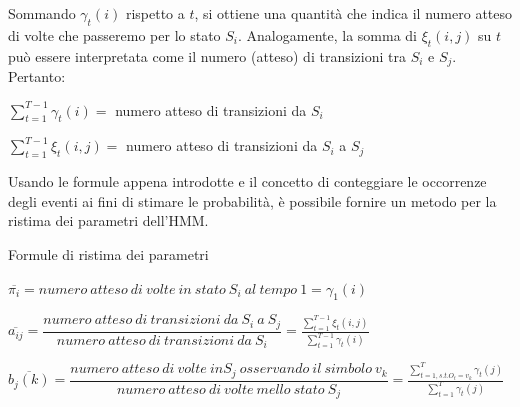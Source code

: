 \documentclass[slidestop,mathserif,red]{beamer}
\begin{document}
\begin{frame}
 \begin{block}{}
  Sommando $\gamma_{t}(i)$ rispetto a $t$, si ottiene una quantit\`a che indica il numero atteso di volte che passeremo per lo stato $S_{i}$. Analogamente, la somma di $\xi_{t}(i,j)$ su $t$ pu\`o essere interpretata come il numero (atteso) di transizioni tra $S_{i}$ e $S_{j}$. Pertanto:
\begin{center}
 $\sum_{t=1}^{T-1}\gamma_{t}(i) =$ numero atteso di transizioni da $S_{i}$
\end{center}
\begin{center}
 $\sum_{t=1}^{T-1}\xi_{t}(i,j) =$ numero atteso di transizioni da $S_{i}$ a $S_{j}$
\end{center}
 \end{block}

\begin{block}{}
 Usando le formule appena introdotte e il concetto di conteggiare le occorrenze degli eventi ai fini di stimare le probabilit\`a, \`e possibile fornire un metodo per la ristima dei parametri dell'HMM.
\end{block}
\end{frame}

\begin{frame}
 \begin{block}{Formule di ristima dei parametri}
 \begin{center}
$\overline{\pi_{i}} = numero\ atteso\ di\ volte\ in\ stato\ S_{i}\ al\ tempo\ 1 = \gamma_{1}(i)$
\end{center}

\begin{center}
 $\overline{a_{ij}} = \dfrac{numero\ atteso\ di\ transizioni\ da\ S_{i}\ a\ S_{j}}{numero\ atteso\ di\ transizioni\ da\ S_{i}} = \frac{\sum_{t=1}^{T-1}\xi_{t}(i,j)}{\sum_{t=1}^{T-1}\gamma_{t}(i)}$
\end{center}

\begin{center}
 $ \overline{b_{j}(k)} = \dfrac{numero\ atteso\ di\ volte\ in S_{j}\ osservando\ il\ simbolo\ v_{k}}{numero\ atteso\ di\ volte\ mello\ stato\ S_{j}} = \frac{\sum_{t=1, s.t. O_{t} = v_{k}}^{T}\gamma_{t}(j)}{\sum_{t=1}^{T}\gamma_{t}(j)}$
\end{center}

 \end{block}

\end{frame}
\end{document}
